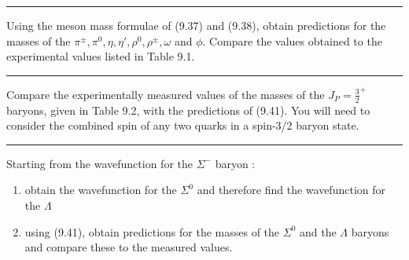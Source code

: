 \noindent\rule{7in}{1.5pt}


\begin{problem}{9.6}
Using the meson mass formulae of (9.37) and (9.38), obtain predictions for the masses of the $\pi^\pm , \pi^0 , \eta , \eta' , \rho^0 , \rho^\pm , \omega$ and $\phi$. Compare the values obtained to the experimental values listed in Table 9.1.
\end{problem}
\begin{solution}

\end{solution}

\noindent\rule{7in}{1.5pt}


\begin{problem}{9.7}
Compare the experimentally measured values of the masses of the $J_P = \frac{3}{2}^+ $ baryons, given in Table 9.2, with the predictions of (9.41). You will need to consider the combined spin of any two quarks in a spin-3/2 baryon state.
\end{problem}
\begin{solution}

\end{solution}

\noindent\rule{7in}{1.5pt}


\begin{problem}{9.8}
Starting from the wavefunction for the $\Sigma^-$ baryon :

\begin{enumerate}[label=(\alph*)]
    \item obtain the wavefunction for the $\Sigma^0$ and therefore find the wavefunction for the $\Lambda$
    \item using (9.41), obtain predictions for the masses of the $\Sigma^0$ and the $\Lambda$ baryons and compare these to the measured values.
\end{enumerate}
\end{problem}
\begin{solution}

\end{solution}

